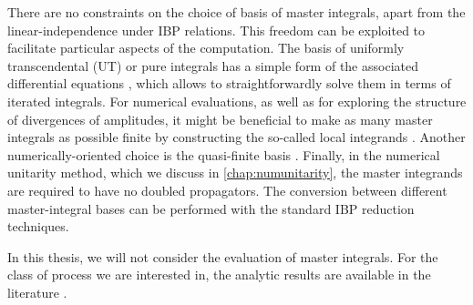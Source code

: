 There are no constraints on the choice of basis of master integrals, apart from the linear-independence under IBP relations. 
This freedom can be exploited to facilitate particular aspects of the computation.
The basis of uniformly transcendental (UT) or pure integrals \cite{ArkaniHamed:2010gh} has a simple form of the
associated differential equations \cite{Henn:2013pwa}, which allows to straightforwardly solve them in terms of iterated integrals.
For numerical evaluations, as well as for exploring the structure of divergences of amplitudes,
it might be beneficial to make as many master integrals as possible finite by constructing the so-called local integrands \cite{ArkaniHamed:2010kv,ArkaniHamed:2010gh,Badger:2016ozq,Badger:2016egz}.
Another numerically-oriented choice is the quasi-finite basis \cite{vonManteuffel:2014qoa,Panzer:2014gra}.
Finally, in the numerical unitarity method, which we discuss in \cref{chap:numunitarity}, the master integrands are required to have no doubled propagators.
The conversion between different master-integral bases can be performed with the standard IBP reduction techniques.


In this thesis, we will not consider the evaluation of master integrals.
For the class of process we are interested in, the analytic results are available in the literature \cite{Gehrmann:2018yef,Papadopoulos:2015jft,Gehrmann:2000zt}.
